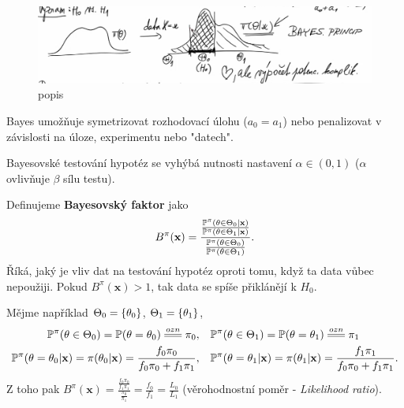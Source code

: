 		\begin{figure}[h]
			\centering
			\includegraphics[width=0.7\linewidth]{pictures/last0}
			\caption{popis}
			\label{fig:last0}
		\end{figure}
\begin{remark}
	Bayes umožňuje symetrizovat rozhodovací úlohu ($a_0=a_1$) nebo penalizovat v závislosti na úloze, experimentu nebo "datech".
	
Bayesovské testování hypotéz se vyhýbá nutnosti nastavení $\alpha\in(0,1)$ ($\alpha$ ovlivňuje $\beta$ sílu testu).
\end{remark}
\begin{define}
	Definujeme \textbf{Bayesovský faktor} jako$$ B^\pi(\textbf{x})=\frac{\frac{\mathbb{P}^\pi(\theta\in\Theta_0|\textbf{x})}{\mathbb{P}^\pi(\theta\in\Theta_1|\textbf{x})}}{\frac{\mathbb{P}^\pi(\theta\in\Theta_0)}{\mathbb{P}^\pi(\theta\in\Theta_1)}}.$$
	Říká, jaký je vliv dat na testování hypotéz oproti tomu, když ta data vůbec nepoužiji. Pokud $B^\pi(\textbf{x})>1$, tak data se spíše přiklánějí k $H_0$.
\end{define}
\begin{remark}
	Mějme například $\Theta_0=\{\theta_0\}$, $\Theta_1=\{\theta_1\}$, \[
	\begin{split}
	\PP^\pi(\t\in\Theta_0)=\PP(\t=\t_0)\equal{ozn}\pi_0,&\quad \PP^\pi(\t\in\Theta_1)=\PP(\t=\t_1)\equal{ozn}\pi_1\\ \PP^\pi(\t=\t_0|\textbf{x})=\pi(\t_0|\textbf{x})=\frac{f_0\pi_0}{f_0\pi_0+f_1\pi_1}, &\quad \PP^\pi(\t=\t_1|\textbf{x})=\pi(\t_1|\textbf{x})=\frac{f_1\pi_1}{f_0\pi_0+f_1\pi_1}.
	\end{split}
	\]Z toho pak 
	$ B^\pi(\textbf{x})=\frac{\frac{f_0\pi_0}{f_1\pi_1}}{\frac{\pi_0}{\pi_1}}=\frac{f_0}{f_1}=\frac{L_0}{L_1}$ (věrohodnostní poměr - \textit{Likelihood ratio}).
\end{remark}

